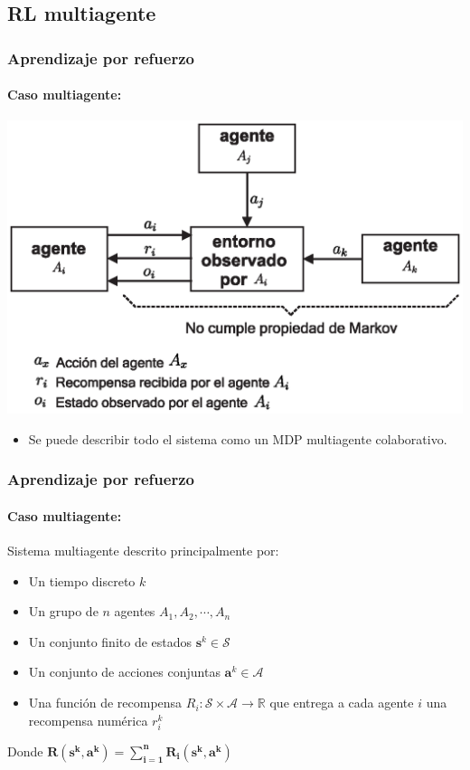 \documentclass[11pt]{beamer}
\begin{document}
\subsection{RL multiagente}
\begin{frame}
\frametitle{Aprendizaje por refuerzo}
\framesubtitle{Caso multiagente:}
\centering
\includegraphics[scale=0.55]{./graficas/multiRL.eps}
\begin{itemize}
\item Se puede describir todo el sistema como un MDP multiagente colaborativo.
\end{itemize}
\end{frame}

\begin{frame}
\frametitle{Aprendizaje por refuerzo}
\framesubtitle{Caso multiagente:}
Sistema multiagente descrito principalmente por:\\
\begin{itemize}
\item Un tiempo discreto $k$
\item Un grupo de $n$ agentes ${A_1, A_2, \cdots, A_n}$
\item Un conjunto finito de estados $\mathbf{s}^k \in \mathcal{S}$
\item Un conjunto de acciones conjuntas $\mathbf{a}^k\in \mathcal{A}$
\item Una función de recompensa $R_i:\mathcal{S} \times \mathcal{A}\rightarrow \mathbb{R}$ que entrega a cada agente $i$ una recompensa numérica $r_i^k$\\
\end{itemize}
\bigskip
\begin{center}
Donde $\mathbf{R(s^k,a^k)=\sum_{i=1}^{n} R_i(s^k,a^k)}$
\end{center}
\end{frame}
\end{document}
